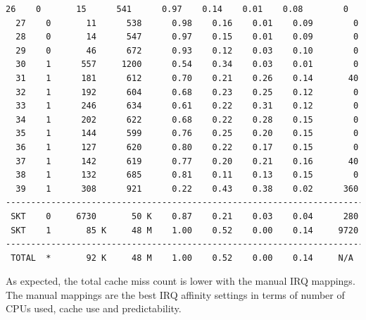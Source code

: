 \begin{lstlisting}[language=TeX]
  26    0       15      541      0.97    0.14    0.01    0.08        0
  27    0       11      538      0.98    0.16    0.01    0.09        0
  28    0       14      547      0.97    0.15    0.01    0.09        0
  29    0       46      672      0.93    0.12    0.03    0.10        0
  30    1      557     1200      0.54    0.34    0.03    0.01        0
  31    1      181      612      0.70    0.21    0.26    0.14       40
  32    1      192      604      0.68    0.23    0.25    0.12        0
  33    1      246      634      0.61    0.22    0.31    0.12        0
  34    1      202      622      0.68    0.22    0.28    0.15        0
  35    1      144      599      0.76    0.25    0.20    0.15        0
  36    1      127      620      0.80    0.22    0.17    0.15        0
  37    1      142      619      0.77    0.20    0.21    0.16       40
  38    1      132      685      0.81    0.11    0.13    0.15        0
  39    1      308      921      0.22    0.43    0.38    0.02      360
------------------------------------------------------------------------
 SKT    0     6730       50 K    0.87    0.21    0.03    0.04      280
 SKT    1       85 K     48 M    1.00    0.52    0.00    0.14     9720
------------------------------------------------------------------------
 TOTAL  *       92 K     48 M    1.00    0.52    0.00    0.14     N/A
\end{lstlisting}
As expected, the total cache miss count is lower with the manual IRQ mappings.
\\
The manual mappings are the best IRQ affinity settings in terms of number of CPUs used,
cache use and predictability.
